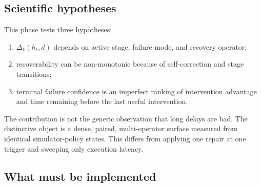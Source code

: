 
\subsection{Scientific hypotheses}

This phase tests three hypotheses:
\begin{enumerate}
  \item $\Delta_k(h_t,d)$ depends on active stage, failure mode, and recovery operator;
  \item recoverability can be non-monotonic because of self-correction and stage transitions;
  \item terminal failure confidence is an imperfect ranking of intervention advantage and time remaining before the last useful intervention.
\end{enumerate}

The contribution is not the generic observation that long delays are bad. The distinctive object is a dense, paired, multi-operator surface measured from identical simulator-policy states. This differs from applying one repair at one trigger and sweeping only execution latency.

\subsection{What must be implemented}


